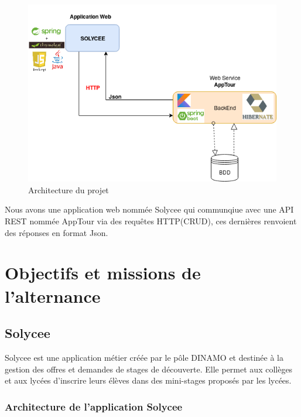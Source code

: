 \documentclass[12pt]{article}
\begin{document}
\begin{figure}[H]
	\centering
 		\includegraphics[width=1\textwidth]{diagrammes/ArchitectureGenerale.png}
  		\caption{Architecture du projet}
\end{figure}

Nous avons une application web nommée Solycee qui communqiue avec une API REST nommée AppTour via des requêtes HTTP(CRUD), ces dernières renvoient des réponses en format Json. 

\section{Objectifs et missions de l'alternance}

\subsection{Solycee}

Solycee est une application métier créée par le pôle DINAMO et destinée à la gestion des offres et demandes de stages de découverte. Elle permet aux collèges et aux lycées d'inscrire leurs élèves dans des mini-stages proposés par les lycées.  

 
\subsubsection{Architecture de l'application Solycee}
\end{document}
